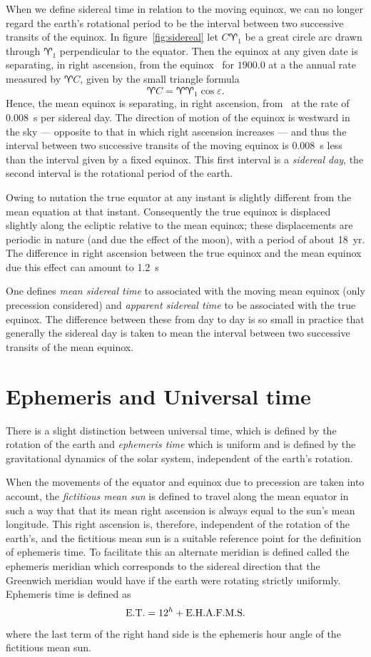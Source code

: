 When we define sidereal time in relation to the moving equinox, we can no longer 
regard the earth's rotational period to be the interval between two successive transits
of the equinox. In figure~\ref{fig:sidereal} let $C\aries_1$ be a great circle arc
drawn through $\aries_1$ perpendicular to the equator. Then the equinox at any given 
date is separating, in right ascension, from the equinox \aries\  for $1900.0$ at a the
annual rate measured by $\aries C$, given by the small triangle formula
\[ 
\aries C=\aries\aries_1\cos\varepsilon.
\]
Hence, the mean equinox is separating, in right ascension, from \aries\  at the rate
of $0.008$~s per sidereal day. The direction of motion of the equinox is westward 
in the sky --- opposite to that in which right ascension increases --- and thus the 
interval between two successive transits of the moving equinox is $0.008$~s less than 
the interval given by a fixed equinox. This first interval is a {\it sidereal day}, 
the second interval is the rotational period of the earth.

Owing to nutation the true equator at any instant is slightly different from the 
mean equation at that instant. Consequently the true equinox is displaced slightly 
along the ecliptic relative to the mean equinox; these displacements are periodic
in nature (and due the effect of the moon), with a period of about 18~yr. 
The difference in right ascension between the true equinox and the mean equinox due 
this effect can amount to 1.2~s

One defines {\it mean sidereal time} to associated with the moving mean equinox 
(only precession considered) and {\it apparent sidereal time} to be associated 
with the true equinox. The difference between these from day to day is so small
in practice that generally the sidereal day is taken to mean the interval between
two successive transits of the mean equinox.

\section{Ephemeris and Universal time}

There is a slight distinction between universal time, which is defined by the 
rotation of the earth and {\it ephemeris time} which is uniform and is defined
by the gravitational dynamics of the solar system, independent of the earth's 
rotation.

When the movements of the equator and equinox due to precession are taken into
account, the {\it fictitious mean sun} is defined to travel along the mean 
equator in such a way that that its mean right ascension is always equal to 
the sun's mean longitude. This right ascension is, therefore, independent 
of the rotation of the earth's, and the fictitious mean sun is a 
suitable reference point for the definition of ephemeris time. To 
facilitate this an alternate meridian is defined called the ephemeris 
meridian which corresponds to the sidereal direction that the
Greenwich meridian would have if the earth were rotating strictly uniformly. 
Ephemeris time is defined as 
\[
{\rm E.T.}=12^h+{\rm E.H.A.F.M.S.}
\]
where the last term of the right hand side is the ephemeris hour angle of the 
fictitious mean sun. 

